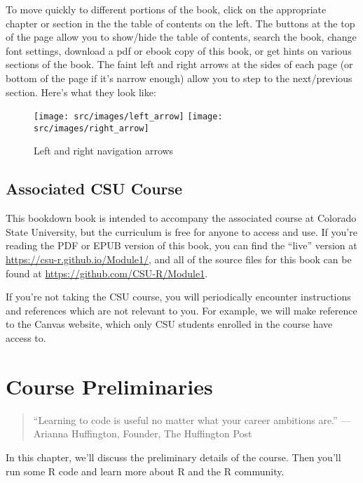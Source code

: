 \documentclass[
]{article}
\begin{document}
To move quickly to different portions of the book, click on the appropriate chapter or section in the the table of contents on the left.
The buttons at the top of the page allow you to show/hide the table of contents, search the book, change font settings, download a pdf or ebook copy of this book, or get hints on various sections of the book.
The faint left and right arrows at the sides of each page (or bottom of the page if it's narrow enough) allow you to step to the next/previous section.
Here's what they look like:

\begin{figure}

{\centering \texttt{[image: src/images/left\_arrow]} \texttt{[image: src/images/right\_arrow]} 

}

\caption{Left and right navigation arrows}\label{fig:unnamed-chunk-1}
\end{figure}

\hypertarget{associated-csu-course}{%
\subsection{Associated CSU Course}\label{associated-csu-course}}

This bookdown book is intended to accompany the associated course at Colorado State University, but the curriculum is free for anyone to access and use.
If you're reading the PDF or EPUB version of this book, you can find the ``live'' version at \url{https://csu-r.github.io/Module1/}, and all of the source files for this book can be found at \url{https://github.com/CSU-R/Module1}.

If you're not taking the CSU course, you will periodically encounter instructions and references which are not relevant to you. For example, we will make reference to the Canvas website, which only CSU students enrolled in the course have access to.

\hypertarget{prelim}{%
\section{Course Preliminaries}\label{prelim}}

\begin{quote}
``Learning to code is useful no matter what your career ambitions are.'' ---Arianna Huffington, Founder, The Huffington Post
\end{quote}

In this chapter, we'll discuss the preliminary details of the course.
Then you'll run some R code and learn more about R and the R community.
\end{document}
